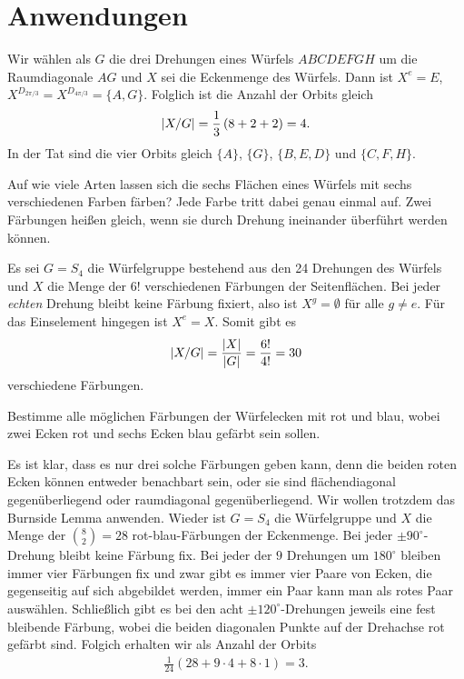 \documentclass[12pt,a4paper]{article}
\begin{document}
\section{Anwendungen}
\begin{beispiel}
Wir wählen als $G$ die drei Drehungen eines Würfels $ABCDEFGH$ um die
Raumdiagonale $AG$ und $X$ sei die Eckenmenge des Würfels. Dann ist $X^{e}=
E$, $X^{D_{2\pi/3}} = X^{D_{4\pi/3}} =\{A,G\}$. Folglich ist die Anzahl der
Orbits gleich
\begin{gather*}
  \left\vert X/G\right\vert =\frac{1}{3} \left( 8 + 2 +2 \right)= 4.
\end{gather*}
In der Tat sind die vier Orbits gleich $\{A\}$, $\{G\}$, $\{B,E,D\} $ und
$\{C, F, H\}$.
\end{beispiel}

\begin{aufgabe}
Auf wie viele Arten lassen sich die sechs Flächen eines Würfels mit sechs
verschiedenen Farben färben?  Jede Farbe tritt dabei genau einmal auf. Zwei
Färbungen heißen gleich, wenn sie durch Drehung ineinander überführt werden
können.
\end{aufgabe}

\begin{loesung} 
Es sei $G=S_4$ die Würfelgruppe bestehend aus den 24 Drehungen des Würfels und
$X$ die Menge der $6!$ verschiedenen Färbungen der Seitenflächen. Bei jeder
{\em echten} Drehung bleibt keine Färbung fixiert, also ist $X^g=\emptyset $
für alle $g\ne e$. Für das Einselement hingegen ist $X^e=X$. Somit gibt es
\begin{gather*}
  \left\vert X/G\right\vert =\frac{\left\vert X\right\vert}{\left\vert G\right\vert} = \frac{6!}{4!} =30
\end{gather*}
verschiedene Färbungen.
\end{loesung}

\begin{aufgabe} 
Bestimme alle möglichen Färbungen der Würfelecken mit rot und blau, wobei zwei
Ecken rot und sechs Ecken blau gefärbt sein sollen.
\end{aufgabe}

\begin{loesung}
Es ist klar, dass es nur drei solche Färbungen geben kann, denn die beiden
roten Ecken können entweder benachbart sein, oder sie sind flächendiagonal
gegenüberliegend oder raumdiagonal gegenüberliegend.  Wir wollen trotzdem das
Burnside Lemma anwenden.  Wieder ist $G=S_4$ die Würfelgruppe und $X$ die
Menge der $\binom{8}{2} = 28$ rot-blau-Färbungen der Eckenmenge.  Bei jeder
$\pm 90^\circ$-Drehung bleibt keine Färbung fix. Bei jeder der $9$ Drehungen
um $180^\circ $ bleiben immer vier Färbungen fix und zwar gibt es immer vier
Paare von Ecken, die gegenseitig auf sich abgebildet werden, immer ein Paar
kann man als rotes Paar auswählen.  Schließlich gibt es bei den acht $\pm
120^\circ $-Drehungen jeweils eine fest bleibende Färbung, wobei die beiden
diagonalen Punkte auf der Drehachse rot gefärbt sind.  Folgich erhalten wir
als Anzahl der Orbits
\begin{gather*}
  \frac{1}{24}\left( 28 +  9\cdot 4 + 8\cdot 1\right) = 3.
\end{gather*}
\end{loesung}
\end{document}
